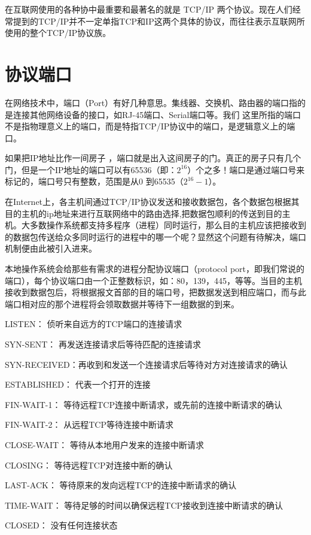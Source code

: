 在互联网使用的各种协中最重要和最著名的就是 TCP/IP 两个协议。现在人们经常提到的TCP/IP并不一定单指TCP和IP这两个具体的协议，而往往表示互联网所使用的整个TCP/IP协议族。

\section{协议端口}

在网络技术中，端口（Port）有好几种意思。集线器、交换机、路由器的端口指的是连接其他网络设备的接口，如RJ-45端口、Serial端口等。我们 这里所指的端口不是指物理意义上的端口，而是特指TCP/IP协议中的端口，是逻辑意义上的端口。

如果把IP地址比作一间房子 ，端口就是出入这间房子的门。真正的房子只有几个门，但是一个IP地址的端口可以有65536（即：$2^{16}$）个之多！端口是通过端口号来标记的，端口号只有整数，范围是从0 到65535（$2^{16}-1$）。

在Internet上，各主机间通过TCP/IP协议发送和接收数据包，各个数据包根据其目的主机的ip地址来进行互联网络中的路由选择,把数据包顺利的传送到目的主机。大多数操作系统都支持多程序（进程）同时运行，那么目的主机应该把接收到的数据包传送给众多同时运行的进程中的哪一个呢？显然这个问题有待解决，端口机制便由此被引入进来。

本地操作系统会给那些有需求的进程分配协议端口（protocol port，即我们常说的端口），每个协议端口由一个正整数标识，如：80，139，445，等等。当目的主机接收到数据包后，将根据报文首部的目的端口号，把数据发送到相应端口，而与此端口相对应的那个进程将会领取数据并等待下一组数据的到来。

\begin{framed}

    LISTEN： 侦听来自远方的TCP端口的连接请求

SYN-SENT： 再发送连接请求后等待匹配的连接请求

SYN-RECEIVED：再收到和发送一个连接请求后等待对方对连接请求的确认

ESTABLISHED： 代表一个打开的连接

FIN-WAIT-1： 等待远程TCP连接中断请求，或先前的连接中断请求的确认

FIN-WAIT-2： 从远程TCP等待连接中断请求

CLOSE-WAIT： 等待从本地用户发来的连接中断请求

CLOSING： 等待远程TCP对连接中断的确认

LAST-ACK： 等待原来的发向远程TCP的连接中断请求的确认

TIME-WAIT： 等待足够的时间以确保远程TCP接收到连接中断请求的确认

CLOSED： 没有任何连接状态

\end{framed}

